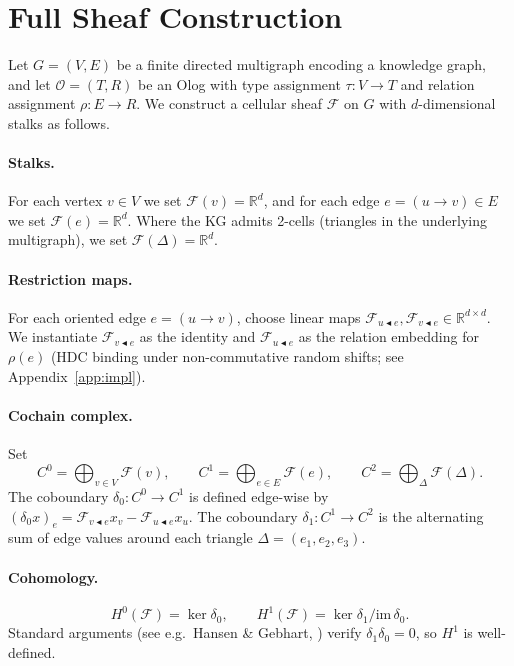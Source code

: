 \section{Full Sheaf Construction}
\label{app:sheaf}

Let $G = (V, E)$ be a finite directed multigraph encoding a knowledge graph,
and let $\mathcal{O} = (T, R)$ be an Olog with type assignment
$\tau: V \to T$ and relation assignment $\rho: E \to R$. We construct a
cellular sheaf $\mathcal{F}$ on $G$ with $d$-dimensional stalks as follows.

\paragraph{Stalks.} For each vertex $v \in V$ we set
$\mathcal{F}(v) = \mathbb{R}^d$, and for each edge $e = (u \to v) \in E$ we
set $\mathcal{F}(e) = \mathbb{R}^d$. Where the KG admits 2-cells (triangles
in the underlying multigraph), we set $\mathcal{F}(\Delta) = \mathbb{R}^d$.

\paragraph{Restriction maps.} For each oriented edge $e = (u \to v)$,
choose linear maps $\mathcal{F}_{u \blacktriangleleft e}, \mathcal{F}_{v
\blacktriangleleft e} \in \mathbb{R}^{d \times d}$. We instantiate
$\mathcal{F}_{v \blacktriangleleft e}$ as the identity and
$\mathcal{F}_{u \blacktriangleleft e}$ as the relation embedding for
$\rho(e)$ (HDC binding under non-commutative random shifts; see
Appendix~\ref{app:impl}).

\paragraph{Cochain complex.} Set
\[
C^0 = \bigoplus_{v \in V} \mathcal{F}(v), \qquad
C^1 = \bigoplus_{e \in E} \mathcal{F}(e), \qquad
C^2 = \bigoplus_{\Delta} \mathcal{F}(\Delta).
\]
The coboundary $\delta_0: C^0 \to C^1$ is defined edge-wise by
$(\delta_0 x)_e = \mathcal{F}_{v \blacktriangleleft e} x_v -
\mathcal{F}_{u \blacktriangleleft e} x_u$. The coboundary
$\delta_1: C^1 \to C^2$ is the alternating sum of edge values around each
triangle $\Delta = (e_1, e_2, e_3)$.

\paragraph{Cohomology.}
\[
H^0(\mathcal{F}) = \ker \delta_0, \qquad
H^1(\mathcal{F}) = \ker \delta_1 / \mathrm{im}\,\delta_0.
\]
Standard arguments (see e.g.\ Hansen \& Gebhart, \cite{hansen2020sheaf})
verify $\delta_1 \delta_0 = 0$, so $H^1$ is well-defined.

